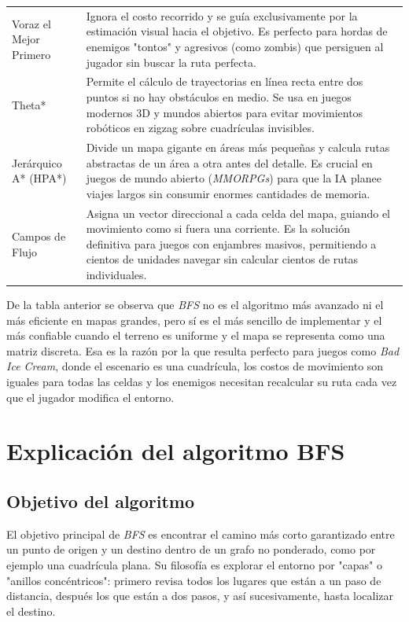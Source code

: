 \documentclass[12pt,letterpaper]{article}
\begin{document}
\begin{table}[H]
\begin{tabularx}{\textwidth}{L{4.0cm}Y}
\addlinespace
Voraz el Mejor Primero &
Ignora el costo recorrido y se guía exclusivamente por la estimación visual hacia el objetivo. Es perfecto para hordas de enemigos "tontos" y agresivos (como zombis) que persiguen al jugador sin buscar la ruta perfecta. \\
\addlinespace
Theta* &
Permite el cálculo de trayectorias en línea recta entre dos puntos si no hay obstáculos en medio. Se usa en juegos modernos 3D y mundos abiertos para evitar movimientos robóticos en zigzag sobre cuadrículas invisibles. \\
\addlinespace
Jerárquico A* (HPA*) &
Divide un mapa gigante en áreas más pequeñas y calcula rutas abstractas de un área a otra antes del detalle. Es crucial en juegos de mundo abierto (\textit{MMORPGs}) para que la IA planee viajes largos sin consumir enormes cantidades de memoria. \\
\addlinespace
Campos de Flujo &
Asigna un vector direccional a cada celda del mapa, guiando el movimiento como si fuera una corriente. Es la solución definitiva para juegos con enjambres masivos, permitiendo a cientos de unidades navegar sin calcular cientos de rutas individuales. \\
\bottomrule
\end{tabularx}
\end{table}

De la tabla anterior se observa que \textit{BFS} no es el algoritmo más avanzado ni el más eficiente en mapas grandes, pero sí es el más sencillo de implementar y el más confiable cuando el terreno es uniforme y el mapa se representa como una matriz discreta. Esa es la razón por la que resulta perfecto para juegos como \textit{Bad Ice Cream}, donde el escenario es una cuadrícula, los costos de movimiento son iguales para todas las celdas y los enemigos necesitan recalcular su ruta cada vez que el jugador modifica el entorno.

\section{Explicación del algoritmo BFS}

\subsection{Objetivo del algoritmo}

El objetivo principal de \textit{BFS} es encontrar el camino más corto garantizado entre un punto de origen y un destino dentro de un grafo no ponderado, como por ejemplo una cuadrícula plana. Su filosofía es explorar el entorno por "capas" o "anillos concéntricos": primero revisa todos los lugares que están a un paso de distancia, después los que están a dos pasos, y así sucesivamente, hasta localizar el destino.
\end{document}
